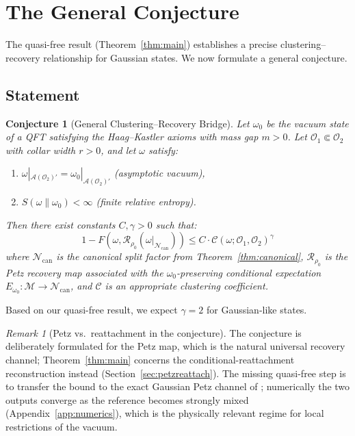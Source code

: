 \documentclass[11pt,a4paper]{article}
\theoremstyle{plain}
\newtheorem{conjecture}[theorem]{Conjecture}
\theoremstyle{definition}
\theoremstyle{remark}
\newtheorem{remark}[theorem]{Remark}
\newcommand{\Aa}{\mathcal{A}}
\newcommand{\Nn}{\mathcal{N}}
\newcommand{\Mm}{\mathcal{M}}
\newcommand{\Oo}{\mathcal{O}}
\newcommand{\Ncan}{\Nn_{\mathrm{can}}}
\begin{document}
\section{The General Conjecture}\label{sec:conjecture}

The quasi-free result (Theorem~\ref{thm:main}) establishes a precise
clustering--recovery relationship for Gaussian states. We now formulate a general
conjecture.

\subsection{Statement}

\begin{conjecture}[General Clustering--Recovery Bridge]\label{conj:general}
Let $\omega_0$ be the vacuum state of a QFT satisfying the Haag--Kastler axioms
with mass gap $m > 0$. Let $\Oo_1 \Subset \Oo_2$ with collar width $r > 0$, and let
$\omega$ satisfy:
\begin{enumerate}
\item[(i)] $\omega|_{\Aa(\Oo_2)'} = \omega_0|_{\Aa(\Oo_2)'}$ (asymptotic vacuum),
\item[(ii)] $S(\omega\|\omega_0) < \infty$ (finite relative entropy).
\end{enumerate}
Then there exist constants $C, \gamma > 0$ such that:
\begin{equation}
1 - F\left(\omega, \mathcal{R}_{\rho_0}(\omega|_{\Ncan})\right)
\le C \cdot \mathcal{C}(\omega; \Oo_1, \Oo_2)^{\gamma}
\end{equation}
where $\Ncan$ is the canonical split factor from Theorem~\ref{thm:canonical},
$\mathcal{R}_{\rho_0}$ is the Petz recovery map associated with the
$\omega_0$-preserving conditional expectation $E_{\omega_0}: \Mm \to \Ncan$, and
$\mathcal{C}$ is an appropriate clustering coefficient.
\end{conjecture}

Based on our quasi-free result, we expect $\gamma = 2$ for Gaussian-like states.

\begin{remark}[Petz vs.\ reattachment in the conjecture]
The conjecture is deliberately formulated for the Petz map, which is the natural
universal recovery channel; Theorem~\ref{thm:main} concerns the
conditional-reattachment reconstruction instead
(Section~\ref{sec:petzreattach}). The missing quasi-free step is to transfer the
bound to the exact Gaussian Petz channel of \cite{LamiDasWilde18}; numerically
the two outputs converge as the reference becomes strongly mixed
(Appendix~\ref{app:numerics}), which is the physically relevant regime for local
restrictions of the vacuum.
\end{remark}
\end{document}
